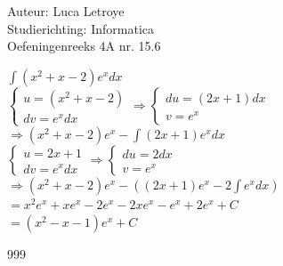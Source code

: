 \documentclass[a4paper]{article}
\begin{document}
  
\noindent \large Auteur: Luca Letroye \\
\noindent \large Studierichting: Informatica\\
\noindent \large Oefeningenreeks 4A nr. 15.6
\\

\medskip
\normalsize

$\displaystyle\int (x^2+x-2)e^xdx$\\

$\left\{
\begin{array}{l}
	u=(x^2+x-2) \\ 
	dv=e^x dx
\end{array}
\right.
\Rightarrow 
\left\{
\begin{array}{l}
	du= 	(2x+1)dx\\
 	v= e^x
\end{array}
\right.$\\

$\Rightarrow (x^2+x-2)e^x - \displaystyle\int (2x+1)e^xdx$\\

$\left\{
\begin{array}{l}
	u=2x+1 \\ 
	dv=e^x dx
\end{array}
\right.
\Rightarrow 
\left\{
\begin{array}{l}
	du= 	2dx\\
 	v= e^x
\end{array}
\right.$\\

$\Rightarrow (x^2+x-2)e^x - \left((2x+1)e^x - 2\displaystyle\int e^xdx \right)$\\

$ = x^2e^x+xe^x-2e^x - 2xe^x-e^x+2e^x +C$\\ 

$ = (x^2-x-1)e^x +C$\\ 


\begin{thebibliography}{999}
\end{thebibliography}
\end{document}
